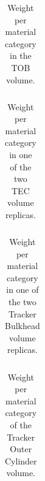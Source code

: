 \documentclass{cmspaper}
\begin{document}
\begin{table}[h]
\begin{center}
\begin{tabular}{clrrrrrr}

\end{tabular}
\caption{Weight per material category in the TOB volume.}
\end{center}
\end{table}

\begin{table}[h]
\begin{center}
\begin{tabular}{clrrrrrr}

\end{tabular}
\caption{Weight per material category in one of the two TEC volume replicas.}
\end{center}
\end{table}

\begin{table}[h]
\begin{center}
\begin{tabular}{clrrrrrr}

\end{tabular}
\caption{Weight per material category in one of the two Tracker Bulkhead volume replicas.}
\end{center}
\end{table}

\begin{table}[h]
\begin{center}
\begin{tabular}{clrrrrrr}

\end{tabular}
\caption{Weight per material category of the Tracker Outer Cylinder volume.}
\end{center}
\end{table}
\end{document}
